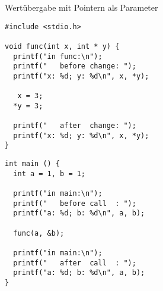
\begin{frame}[fragile]{Wertübergabe mit Pointern als Parameter}
%
%
\begin{codebox}[Code, equal height group=gByRef]
\begin{verbatim}
#include <stdio.h>

void func(int x, int * y) {
  printf("in func:\n");
  printf("   before change: ");
  printf("x: %d; y: %d\n", x, *y);

   x = 3;
  *y = 3;

  printf("   after  change: ");
  printf("x: %d; y: %d\n", x, *y);
}
\end{verbatim}
\end{codebox}
%
\begin{codebox}[... Fortsetzung, equal height group=gByRef]
\begin{verbatim}
int main () {
  int a = 1, b = 1;

  printf("in main:\n");
  printf("   before call  : ");
  printf("a: %d; b: %d\n", a, b);

  func(a, &b);

  printf("in main:\n");
  printf("   after  call  : ");
  printf("a: %d; b: %d\n", a, b);
}
\end{verbatim}
\end{codebox}
%
\end{frame}


